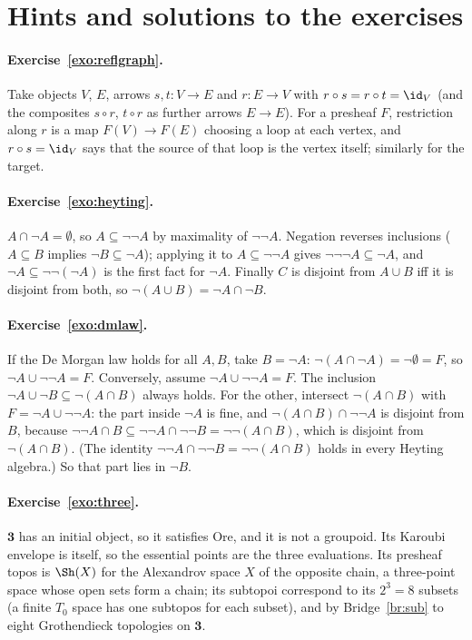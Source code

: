 \section{Hints and solutions to the exercises}\label{sec:solutions}

\paragraph{Exercise~\ref{exo:reflgraph}.} Take objects $V$, $E$, arrows $s,t : V\to E$ and $r : E\to V$ with $r\circ s = r\circ t = \id_V$ (and the composites $s\circ r$, $t\circ r$ as further arrows $E\to E$). For a presheaf $F$, restriction along $r$ is a map $F(V)\to F(E)$ choosing a loop at each vertex, and $r\circ s = \id_V$ says that the source of that loop is the vertex itself; similarly for the target.

\paragraph{Exercise~\ref{exo:heyting}.} $A\cap\neg A = \emptyset$, so $A\subseteq\neg\neg A$ by maximality of $\neg\neg A$. Negation reverses inclusions ($A\subseteq B$ implies $\neg B\subseteq\neg A$); applying it to $A\subseteq\neg\neg A$ gives $\neg\neg\neg A\subseteq\neg A$, and $\neg A\subseteq\neg\neg(\neg A)$ is the first fact for $\neg A$. Finally $C$ is disjoint from $A\cup B$ iff it is disjoint from both, so $\neg(A\cup B) = \neg A\cap\neg B$.

\paragraph{Exercise~\ref{exo:dmlaw}.} If the De Morgan law holds for all $A,B$, take $B = \neg A$: $\neg(A\cap\neg A) = \neg\emptyset = F$, so $\neg A\cup\neg\neg A = F$. Conversely, assume $\neg A\cup\neg\neg A = F$. The inclusion $\neg A\cup\neg B\subseteq\neg(A\cap B)$ always holds. For the other, intersect $\neg(A\cap B)$ with $F = \neg A\cup\neg\neg A$: the part inside $\neg A$ is fine, and $\neg(A\cap B)\cap\neg\neg A$ is disjoint from $B$, because $\neg\neg A\cap B\subseteq\neg\neg A\cap\neg\neg B = \neg\neg(A\cap B)$, which is disjoint from $\neg(A\cap B)$. (The identity $\neg\neg A\cap\neg\neg B = \neg\neg(A\cap B)$ holds in every Heyting algebra.) So that part lies in $\neg B$.

\paragraph{Exercise~\ref{exo:three}.} $\mathbf 3$ has an initial object, so it satisfies Ore, and it is not a groupoid. Its Karoubi envelope is itself, so the essential points are the three evaluations. Its presheaf topos is $\Sh(X)$ for the Alexandrov space $X$ of the opposite chain, a three-point space whose open sets form a chain; its subtopoi correspond to its $2^3 = 8$ subsets (a finite $T_0$ space has one subtopos for each subset), and by Bridge~\ref{br:sub} to eight Grothendieck topologies on $\mathbf 3$.


